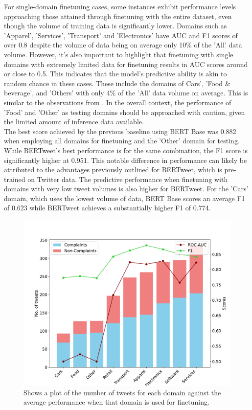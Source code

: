 For single-domain finetuning cases, some instances exhibit performance levels approaching those attained through finetuning with the entire dataset, even though the volume of training data is significantly lower. Domains such as 'Apparel', 'Services', 'Transport' and 'Electronics' have AUC and F1 scores of over 0.8 despite the volume of data being on average only 10\% of the 'All' data volume. However, it's also important to highlight that finetuning with single domains with extremely limited data for finetuning results in AUC scores around or close to 0.5. This indicates that the model's predictive ability is akin to random chance in these cases. These include the domains of Cars', 'Food \& beverage', and 'Others' with only 4\% of the 'All' data volume on average. This is similar to the observations from \cite{jin_complaint_2020}. In the overall context, the performance of  'Food' and 'Other' as testing domains should be approached with caution, given the limited amount of inference data available.\\

The best score achieved by the previous baseline \cite{jin_complaint_2020} using BERT Base was 0.882 when employing all domains for finetuning and the 'Other' domain for testing. While BERTweet's best performance is for the same combination, the F1 score is significantly higher at 0.951. This notable difference in performance can likely be attributed to the advantages previously outlined for BERTweet, which is pre-trained on Twitter data. The predictive performance when finetuning with domains with very low tweet volumes is also higher for BERTweet. For the 'Cars' domain, which uses the lowest volume of data, BERT Base scores an average F1 of 0.623 \cite{jin_complaint_2020} while BERTweet achieves a substantially higher F1 of 0.774.\\

\begin{figure}[htb]
    \centering
    \captionsetup{font=small}
    \includegraphics[width=12cm]{figures/cross_domain_instancevsmetric.pdf}
    \vspace*{-3mm}
    \caption{Shows a plot of the number of tweets for each domain against the average performance when that domain is used for finetuning.}
    \label{fig: cross_domain_train_domain}
\end{figure}

